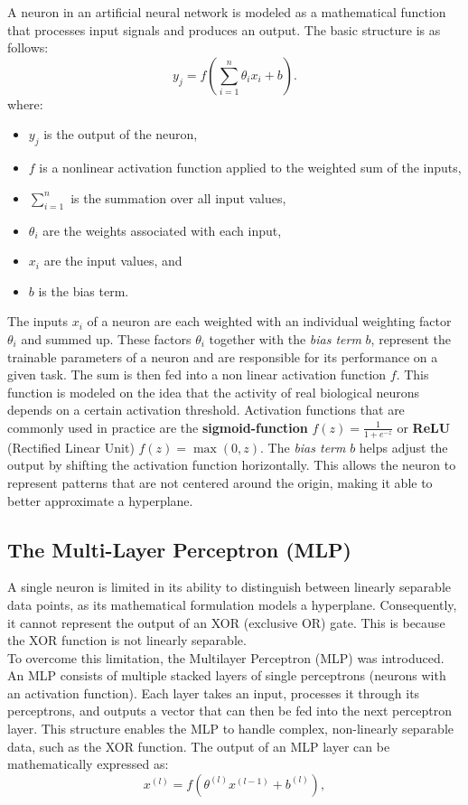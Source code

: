 A neuron in an artificial neural network is modeled as a mathematical function that processes input signals and produces an output. The basic structure is as follows:
\[
y_j = f \left( \sum_{i=1}^{n} \theta_i x_i + b \right).
\]
where:
\begin{itemize}
    \item \( y_j \) is the output of the neuron,
    \item \( f \) is a nonlinear activation function applied to the weighted sum of the inputs,
    \item \( \sum_{i=1}^{n} \) is the summation over all input values,
    \item \( \theta_i \) are the weights associated with each input,
    \item \( x_i \) are the input values, and
    \item \( b \) is the bias term.
\end{itemize}
The inputs $x_i$ of a neuron are each weighted with an individual weighting factor $\theta_i$ and summed up.
These factors $\theta_i$ together with the \emph{bias term} $b$,
represent the trainable parameters of a neuron and are responsible for its performance on a given task.
The sum is then fed into a non linear activation function $f$.
This function is modeled on the idea that the activity of real biological neurons depends on a certain activation threshold\cite{GrundkursAI}.
Activation functions that are commonly used in practice are the \textbf{sigmoid-function}  $f(z) = \frac{1}{1 + e^{-z}}$ or \textbf{ReLU} (Rectified Linear Unit) $f(z) = \max(0, z)$\cite{nair2010rectified}.
The \emph{bias term} $b$ helps adjust the output by shifting the activation function horizontally.
This allows the neuron to represent patterns that are not centered around the origin, making it able to better approximate a hyperplane.\cite{GrundkursAI}

\subsection{The Multi-Layer Perceptron (MLP)}
\label{sec:mlp}

A single neuron is limited in its ability to distinguish between linearly separable data points, as its mathematical formulation models a hyperplane. Consequently, it cannot represent the output of an XOR (exclusive OR) gate.
This is because the XOR function is not linearly separable.\cite{Goodfellow-et-al-2016}\\
To overcome this limitation, the Multilayer Perceptron (MLP) was introduced.
An MLP consists of multiple stacked layers of single perceptrons (neurons with an activation function).
Each layer takes an input, processes it through its perceptrons, and outputs a vector that can then be fed into the next perceptron layer.
This structure enables the MLP to handle complex, non-linearly separable data, such as the XOR function.\cite{Goodfellow-et-al-2016}
The output of an MLP layer can be mathematically expressed as:
\[
x^{(l)} = f \left( \theta^{(l)} x^{(l-1)} + b^{(l)} \right),
\]


